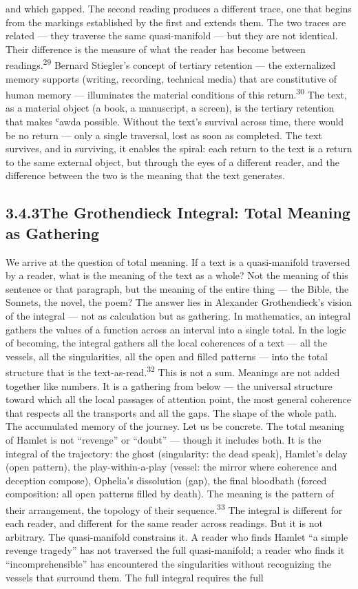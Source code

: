 and which gapped. The second reading produces a different trace, one that begins from the markings established by the first and extends them. The two traces are related — they traverse the same quasi-manifold — but they are not identical. Their difference is the measure of what the reader has become between readings.\textsuperscript{29} Bernard Stiegler’s concept of tertiary retention — the externalized memory supports (writing, recording, technical media) that are constitutive of human memory — illuminates the material conditions of this return.\textsuperscript{30} The text, as a material object (a book, a manuscript, a screen), is the tertiary retention that makes ʿawda possible. Without the text’s survival across time, there would be no return — only a single traversal, lost as soon as completed. The text survives, and in surviving, it enables the spiral: each return to the text is a return to the same external object, but through the eyes of a different reader, and the difference between the two is the meaning that the text generates.

\subsection{3.4.3\quad The Grothendieck Integral: Total Meaning as Gathering}

We arrive at the question of total meaning. If a text is a quasi-manifold traversed by a reader, what is the meaning of the text as a whole? Not the meaning of this sentence or that paragraph, but the meaning of the entire thing — the Bible, the Sonnets, the novel, the poem? The answer lies in Alexander Grothendieck’s vision of the integral — not as calculation but as gathering. In mathematics, an integral gathers the values of a function across an interval into a single total. In the logic of becoming, the integral gathers all the local coherences of a text — all the vessels, all the singularities, all the open and filled patterns — into the total structure that is the text-as-read.\textsuperscript{32} This is not a sum. Meanings are not added together like numbers. It is a gathering from below — the universal structure toward which all the local passages of attention point, the most general coherence that respects all the transports and all the gaps. The shape of the whole path. The accumulated memory of the journey. Let us be concrete. The total meaning of Hamlet is not “revenge” or “doubt” — though it includes both. It is the integral of the trajectory: the ghost (singularity: the dead speak), Hamlet’s delay (open pattern), the play-within-a-play (vessel: the mirror where coherence and deception compose), Ophelia’s dissolution (gap), the final bloodbath (forced composition: all open patterns filled by death). The meaning is the pattern of their arrangement, the topology of their sequence.\textsuperscript{33} The integral is different for each reader, and different for the same reader across readings. But it is not arbitrary. The quasi-manifold constrains it. A reader who finds Hamlet “a simple revenge tragedy” has not traversed the full quasi-manifold; a reader who finds it “incomprehensible” has encountered the singularities without recognizing the vessels that surround them. The full integral requires the full

